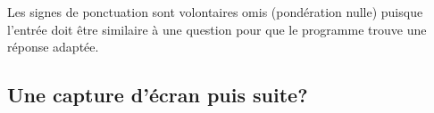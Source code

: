 \begin{description}
  Les signes de ponctuation sont volontaires omis (pondération nulle) puisque l'entrée doit être similaire à une question pour que le programme trouve une réponse adaptée.
\end{description}

\subsection{Une capture d'écran puis suite?}